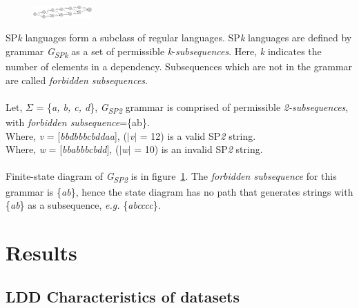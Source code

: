 \documentclass[a0,portrait]{a0poster}
\begin{document}
\begin{multicols}{2}
\color{black}

\begin{figure}
\begin{center}
\includegraphics[width=0.2\textwidth]{fsa1.png}
\label{fig:fsa1}
\end{center}
\end{figure}

SP\emph{k} languages form a subclass of regular languages. SP\emph{k} languages are defined by grammar \emph{G}\textsubscript{\emph{SPk}} as a set of permissible \emph{k}-\emph{subsequences}. Here, \emph{k} indicates the number of elements in a dependency. Subsequences which are not in the grammar are called \emph{forbidden subsequences}. \\
\\
Let, \( \Sigma \) = \{\emph{a, b, c, d}\}, \emph{G\textsubscript{SP\emph{2}}} grammar is comprised of permissible \emph{2-subsequences}, with \emph{forbidden subsequence}=\{ab\}. \\
Where, \emph{v} = [\emph{bbdbbbcbddaa}], (\( \vert \)\emph{v}\( \vert \) = 12) is a valid SP\emph{2} string. \\
Where, \emph{w} = [\emph{bbabbbcbdd}], (\( \vert \)\emph{w}\( \vert \) = 10) is an invalid SP\emph{2} string. \\
\\
Finite-state diagram of \emph{G\textsubscript{SP2}} is in figure~\ref{fig:fsa1}. The \emph{forbidden subsequence} for this grammar is \{\emph{ab}\}, hence the state diagram has no path that generates strings with \{\emph{ab}\} as a subsequence, \emph{e.g.} \{\emph{abcccc}\}.


\color{tudLogoColor}

\section*{Results}

\subsection*{LDD Characteristics of datasets}


\end{multicols}
\end{document}

